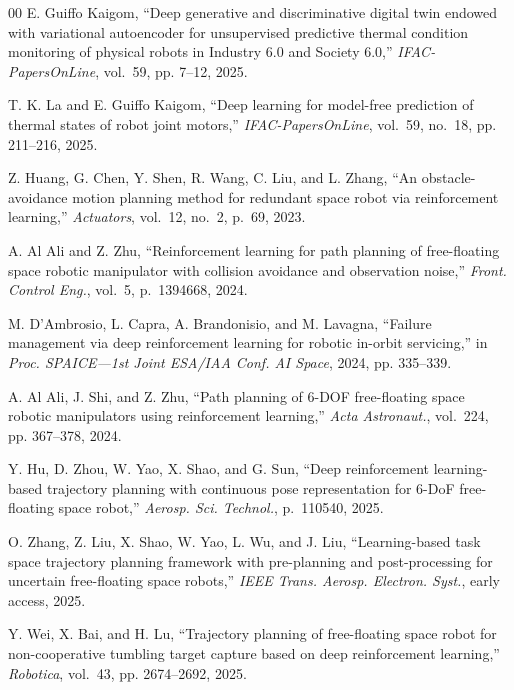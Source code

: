 \documentclass{ieeeaccess}
\begin{document}
\begin{thebibliography}{00}
E. Guiffo Kaigom, ``Deep generative and discriminative digital twin endowed with variational autoencoder for
unsupervised predictive thermal condition monitoring of physical robots in Industry 6.0 and Society 6.0,''
\emph{IFAC-PapersOnLine}, vol.~59, pp. 7--12, 2025.

T. K. La and E. Guiffo Kaigom, ``Deep learning for model-free prediction of thermal states of robot joint
motors,'' \emph{IFAC-PapersOnLine}, vol.~59, no.~18, pp. 211--216, 2025.

 Z. Huang, G. Chen, Y. Shen, R. Wang, C. Liu, and L. Zhang, ``An
obstacle-avoidance motion planning method for redundant space robot via reinforcement learning,''
\emph{Actuators}, vol.~12, no.~2, p.~69, 2023.



 A. Al Ali and Z. Zhu, ``Reinforcement learning for path planning of
free-floating space robotic manipulator with collision avoidance and observation noise,'' \emph{Front.
Control Eng.}, vol.~5, p.~1394668, 2024.



M. D'Ambrosio, L. Capra, A. Brandonisio, and M. Lavagna, ``Failure management via deep reinforcement
learning for robotic in-orbit servicing,'' in \emph{Proc. SPAICE---1st Joint ESA/IAA Conf. AI Space}, 2024,
pp. 335--339.



A. Al Ali, J. Shi, and Z. Zhu, ``Path planning of 6-DOF free-floating space
robotic manipulators using reinforcement learning,'' \emph{Acta Astronaut.}, vol.~224, pp. 367--378, 2024.



 Y. Hu, D. Zhou, W. Yao, X. Shao, and G. Sun, ``Deep reinforcement learning-based
trajectory planning with continuous pose representation for 6-DoF free-floating space robot,''
\emph{Aerosp. Sci. Technol.}, p.~110540, 2025.



 O. Zhang, Z. Liu, X. Shao, W. Yao, L. Wu, and J. Liu, ``Learning-based task
space trajectory planning framework with pre-planning and post-processing for uncertain free-floating
space robots,'' \emph{IEEE Trans. Aerosp. Electron. Syst.}, early access, 2025.



 Y. Wei, X. Bai, and H. Lu, ``Trajectory planning of free-floating space robot
for non-cooperative tumbling target capture based on deep reinforcement learning,'' \emph{Robotica},
vol.~43, pp. 2674--2692, 2025.




\end{thebibliography}
\end{document}
